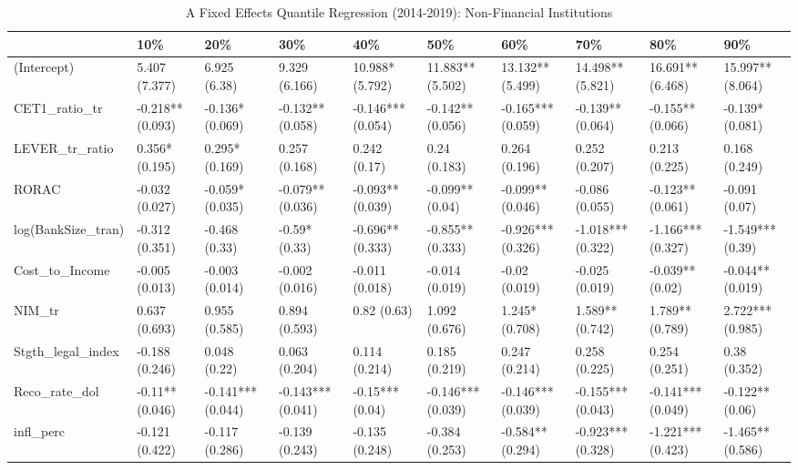 \begin{table}[ht]
\centering
\caption{A Fixed Effects Quantile Regression (2014-2019): Non-Financial Institutions} 
\begingroup\small
\begin{tabular}{llllllllll}
  \toprule
 & 10\% & 20\% & 30\% & 40\% & 50\% & 60\% & 70\% & 80\% & 90\% \\ 
  \midrule
(Intercept) & 5.407 (7.377) & 6.925 (6.38) & 9.329 (6.166) & 10.988* (5.792) & 11.883** (5.502) & 13.132** (5.499) & 14.498** (5.821) & 16.691** (6.468) & 15.997** (8.064) \\ 
  CET1\_ratio\_tr & -0.218** (0.093) & -0.136* (0.069) & -0.132** (0.058) & -0.146*** (0.054) & -0.142** (0.056) & -0.165*** (0.059) & -0.139** (0.064) & -0.155** (0.066) & -0.139* (0.081) \\ 
  LEVER\_tr\_ratio & 0.356* (0.195) & 0.295* (0.169) & 0.257 (0.168) & 0.242 (0.17) & 0.24 (0.183) & 0.264 (0.196) & 0.252 (0.207) & 0.213 (0.225) & 0.168 (0.249) \\ 
  RORAC & -0.032 (0.027) & -0.059* (0.035) & -0.079** (0.036) & -0.093** (0.039) & -0.099** (0.04) & -0.099** (0.046) & -0.086 (0.055) & -0.123** (0.061) & -0.091 (0.07) \\ 
  log(BankSize\_tran) & -0.312 (0.351) & -0.468 (0.33) & -0.59* (0.33) & -0.696** (0.333) & -0.855** (0.333) & -0.926*** (0.326) & -1.018*** (0.322) & -1.166*** (0.327) & -1.549*** (0.39) \\ 
  Cost\_to\_Income & -0.005 (0.013) & -0.003 (0.014) & -0.002 (0.016) & -0.011 (0.018) & -0.014 (0.019) & -0.02 (0.019) & -0.025 (0.019) & -0.039** (0.02) & -0.044** (0.019) \\ 
  NIM\_tr & 0.637 (0.693) & 0.955 (0.585) & 0.894 (0.593) & 0.82 (0.63) & 1.092 (0.676) & 1.245* (0.708) & 1.589** (0.742) & 1.789** (0.789) & 2.722*** (0.985) \\ 
  Stgth\_legal\_index & -0.188 (0.246) & 0.048 (0.22) & 0.063 (0.204) & 0.114 (0.214) & 0.185 (0.219) & 0.247 (0.214) & 0.258 (0.225) & 0.254 (0.251) & 0.38 (0.352) \\ 
  Reco\_rate\_dol & -0.11** (0.046) & -0.141*** (0.044) & -0.143*** (0.041) & -0.15*** (0.04) & -0.146*** (0.039) & -0.146*** (0.039) & -0.155*** (0.043) & -0.141*** (0.049) & -0.122** (0.06) \\ 
  infl\_perc & -0.121 (0.422) & -0.117 (0.286) & -0.139 (0.243) & -0.135 (0.248) & -0.384 (0.253) & -0.584** (0.294) & -0.923*** (0.328) & -1.221*** (0.423) & -1.465** (0.586) \\ 

\end{tabular}
\end{table}

